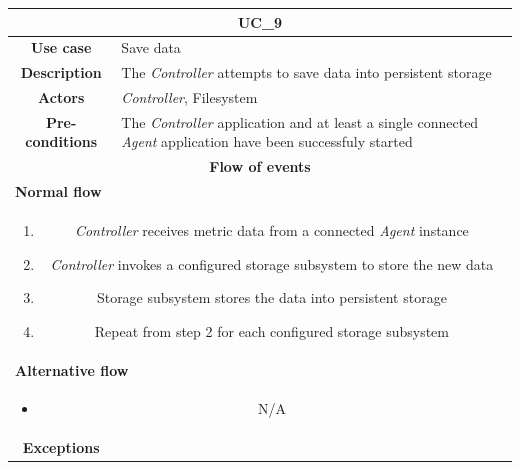 \documentclass[12pt,a4paper,table]{article}
\begin{document}
            \vspace{0.5cm}
            \noindent
            \begin{longtable}{ |c|p{11.8cm}| }
                \hline
                \multicolumn{2}{|c|}{\cellcolor{lime} \textbf{UC\_9}}\\ \hline
                \cellcolor[gray]{0.9} \textbf{Use case} & Save data\\ \hline
                \cellcolor[gray]{0.9} \textbf{Description} & The \textit{Controller} attempts to save data into persistent storage\\ \hline
                \cellcolor[gray]{0.9} \textbf{Actors} & \textit{Controller}, Filesystem\\ \hline
                \cellcolor[gray]{0.9} \textbf{Pre-conditions} & The \textit{Controller} application and at least a single connected \textit{Agent} application have been successfuly started\\ \hline
                \multicolumn{2}{|c|}{\cellcolor[gray]{0.9} \textbf{Flow of events}}\\ \hline
                \multicolumn{2}{|l|}{\cellcolor[gray]{0.9} \textbf{Normal flow}}\\ \hline
                \multicolumn{2}{|p{14cm}|}{
                    \begin{enumerate}
                        \item \textit{Controller} receives metric data from a connected \textit{Agent} instance
                        \item \textit{Controller} invokes a configured storage subsystem to store the new data
                        \item Storage subsystem stores the data into persistent storage
                        \item Repeat from step 2 for each configured storage subsystem
                    \end{enumerate}
                }\\ \hline
                \multicolumn{2}{|l|}{\cellcolor[gray]{0.9} \textbf{Alternative flow}}\\ \hline
                \multicolumn{2}{|p{14cm}|}{
                    \begin{itemize}
                        \item N/A
                    \end{itemize}
                }\\ \hline
                \cellcolor[gray]{0.9} \textbf{Exceptions} & 

\end{longtable}
\end{document}
